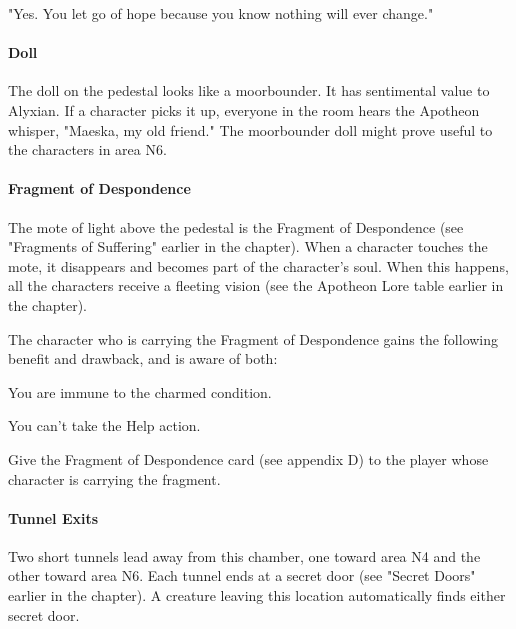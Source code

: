 \documentclass[10pt,a4paper,twoside,bg=print,twocolumn,openany,nodeprecatedcode]{dndbook}
\begin{document}
\begin{DndReadAloud}{}
"Yes. You let go of hope because you know nothing will ever change."

\end{DndReadAloud}

\paragraph{Doll}
The doll on the pedestal looks like a moorbounder. It has sentimental value to Alyxian. If a character picks it up, everyone in the room hears the Apotheon whisper, "Maeska, my old friend." The moorbounder doll might prove useful to the characters in area N6.

\paragraph{Fragment of Despondence}
The mote of light above the pedestal is the Fragment of Despondence (see "Fragments of Suffering" earlier in the chapter). When a character touches the mote, it disappears and becomes part of the character's soul. When this happens, all the characters receive a fleeting vision (see the Apotheon Lore table earlier in the chapter).

The character who is carrying the Fragment of Despondence gains the following benefit and drawback, and is aware of both:

\begin{DndComment}{}

\begin{description}[nolistsep]
\item[Benefit.]
You are immune to the charmed condition.
\item[Drawback.]
You can't take the Help action.
\end{description}

\end{DndComment}

Give the Fragment of Despondence card (see appendix D) to the player whose character is carrying the fragment.

\paragraph{Tunnel Exits}
Two short tunnels lead away from this chamber, one toward area N4 and the other toward area N6. Each tunnel ends at a secret door (see "Secret Doors" earlier in the chapter). A creature leaving this location automatically finds either secret door.
\end{document}
